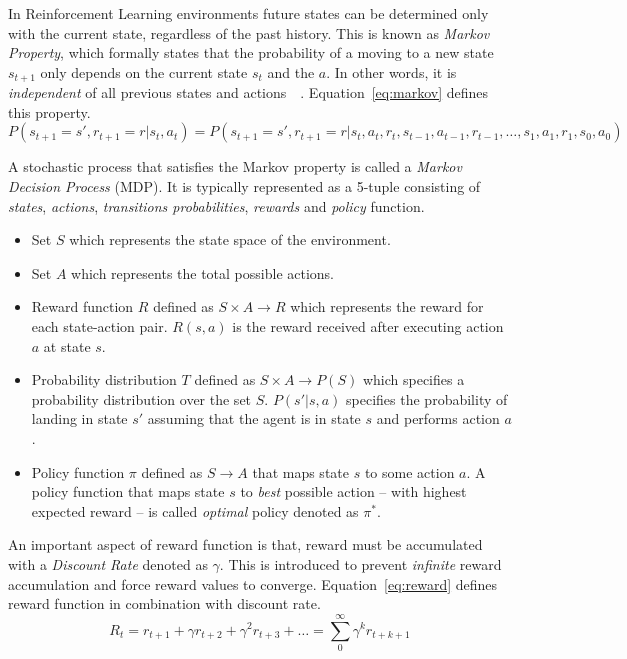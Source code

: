 In Reinforcement Learning environments future states can be determined only with the current state, regardless of the past history. This is known as \emph{Markov Property}, which formally states that the probability of a moving to a new state $s_{t+1}$ only depends on the current state $s_t$ and the $a$. In other words, it is \emph{independent} of all previous states and actions~\cite{rlIntro}~\cite{Lorido-Botran2014}. Equation~\ref{eq:markov} defines this property.
\begin{equation}
P(s_{t+1} = s',r_{t+1} = r | s_t,a_t) = P(s_{t+1} = s',r_{t+1} = r | s_t,a_t,r_t,s_{t-1},a_{t-1},r_{t-1},\dots,s_1,a_1,r_1,s_0,a_0)
\label{eq:markov}
\end{equation}

A stochastic process that satisfies the Markov property is called a \emph{Markov Decision Process} (MDP). It is typically represented as a 5-tuple consisting of \emph{states}, \emph{actions}, \emph{transitions probabilities}, \emph{rewards} and \emph{policy} function.
\begin{itemize}
    \item Set $S$ which represents the state space of the environment.
    \item Set $A$ which represents the total possible actions.
    \item Reward function $R$ defined as $S \times A \rightarrow R$ which represents the reward for each state-action pair. $R(s,a)$ is the reward received after executing action $a$ at state $s$.
    \item Probability distribution $T$ defined as $S \times A \rightarrow P(S)$ which specifies a probability distribution over the set $S$. $P(s'|s,a)$ specifies the probability of landing in state $s'$ assuming that the agent is in state $s$ and performs action $a$.
    \item Policy function $\pi$ defined as $S \rightarrow A$ that maps state $s$ to some action $a$. A policy function that maps state $s$ to \emph{best} possible action -- with highest expected reward -- is called \emph{optimal} policy denoted as $\pi^*$.
\end{itemize}

An important aspect of reward function is that, reward must be accumulated with a \emph{Discount Rate} denoted as $\gamma$. This is introduced to prevent \emph{infinite} reward accumulation and force reward values to converge. Equation~\ref{eq:reward} defines reward function in combination with discount rate.
\begin{equation}
    R_t = r_{t+1}+\gamma r_{t+2}+\gamma^2 r_{t+3}+\dots=\sum_{0}^{\infty}\gamma^k r_{t+k+1}
    \label{eq:reward}
\end{equation}

